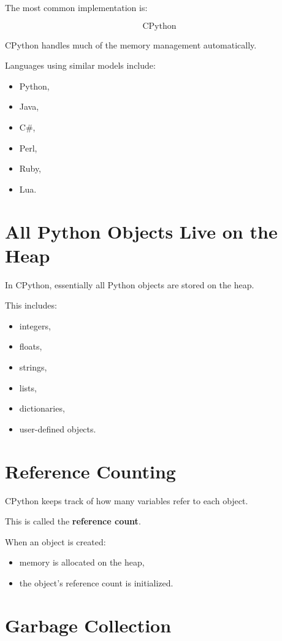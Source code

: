 \documentclass[11pt]{article}
\begin{document}
The most common implementation is:

\[
\text{CPython}
\]

CPython handles much of the memory management automatically.

Languages using similar models include:

\begin{itemize}
    \item Python,
    \item Java,
    \item C\#,
    \item Perl,
    \item Ruby,
    \item Lua.
\end{itemize}

\section{All Python Objects Live on the Heap}

In CPython, essentially all Python objects are stored on the heap.

This includes:

\begin{itemize}
    \item integers,
    \item floats,
    \item strings,
    \item lists,
    \item dictionaries,
    \item user-defined objects.
\end{itemize}

\section{Reference Counting}

CPython keeps track of how many variables refer to each object.

This is called the \textbf{reference count}.

When an object is created:

\begin{itemize}
    \item memory is allocated on the heap,
    \item the object's reference count is initialized.
\end{itemize}

\section{Garbage Collection}
\end{document}
